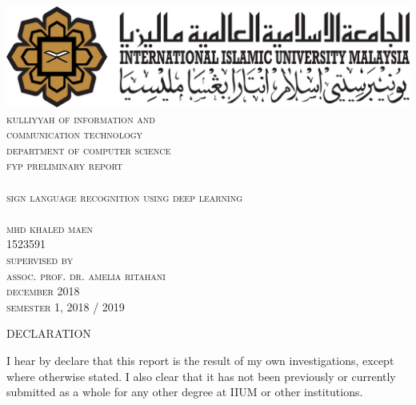 \documentclass[12pt]{report}
\begin{document}
        \begin{titlepage}
            \center
            \includegraphics[width = 15 cm]{./images/iium.png}
            \textsc{\LARGE }\\[1 cm]
            \textsc{\LARGE kulliyyah of information and}\\[.1 cm]
            \textsc{\LARGE communication technology}\\[1 cm]
            \textsc{\Large department of computer science}\\ [ .2 cm]
            \textsc{\large fyp preliminary report}\\ [.5 cm]
            \hrulefill \\[0.2cm]
            \textsc{\Large sign language recognition using deep learning}\\
            \hrulefill \\[1 cm]

            \textsc{\large mhd khaled maen}\\[.1 cm]
            \textsc{1523591}\\ [1 cm]
             

            \textsc{\large supervised by}\\[.1 cm]
            \textsc{\large assoc. prof. dr. amelia ritahani}\\[2 cm]

            \textsc{\large december} 2018\\ [.2 cm]
            \textsc{\large semester} 1, 2018 / 2019 \\

        \end{titlepage}
    
    \begin{center}
        \LARGE DECLARATION
    \end{center}   

        I hear by declare that this report is the result of my own investigations,
        except where otherwise stated. I also clear that it 
        has not been previously or currently submitted as a whole for any other degree 
        at IIUM or other institutions.
\end{document}
